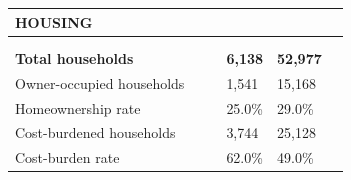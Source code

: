 \documentclass[9pt]{report}
\begin{document}
\vspace{12pt}
\setlength{\tabcolsep}{.01in} %
\begin{tabular}{p{.10in}p{.10in}p{.10in}p{3.7in}>{\hfill}p{.85in}>{\hfill}p{.85in}>{\hfill}p{.85in}>{\hfill}p{.85in}p{0.1in}}
\multicolumn{9}{l}{\parbox{7.1in}{\raggedright{\large{\strut\textbf{HOUSING}\strut}}}} \\ 
\hline
\multicolumn{4}{l}{\parbox{3.5in}{\raggedright{\textbf{}}}} & \multicolumn{1}{r}{\parbox{.85in}{\strut\raggedleft{\textbf{}\strut}}} & \multicolumn{1}{r}{\parbox{.85in}{\strut\raggedleft{\textbf{}\strut}}} & \multicolumn{1}{r}{\parbox{.85in}{\strut{}}} & \multicolumn{1}{r}{\parbox{.85in}{\strut{}}} & \\ 
\multicolumn{9}{l}{} \\ 
\multicolumn{4}{l}{\parbox{3.5in}{\strut\raggedright{\textbf{Total households}\strut}}} & \textbf{} & \textbf{} & \textbf{6,138} & \textbf{52,977} & \textbf{} \\ 
\multicolumn{4}{l}{\parbox{3.6in}{\strut\raggedright{{Owner-occupied households}}\strut}} &  &  & 1,541 & 15,168 & \multicolumn{1}{l}{}  \\ 
\multicolumn{4}{l}{\parbox{3.6in}{\strut\raggedright{{Homeownership rate}}\strut}} &  &  & 25.0\% & 29.0\% & \multicolumn{1}{l}{}  \\ 
\multicolumn{4}{l}{\parbox{3.6in}{\strut\raggedright{{Cost-burdened households}}\strut}} &  &  & 3,744 & 25,128 & \multicolumn{1}{l}{}  \\ 
\multicolumn{4}{l}{\parbox{3.6in}{\strut\raggedright{{Cost-burden rate}}\strut}} &  &  & 62.0\% & 49.0\% & \multicolumn{1}{l}{}  \\ 

\end{tabular}
\setlength{\tabcolsep}{6pt} %
\end{document}

